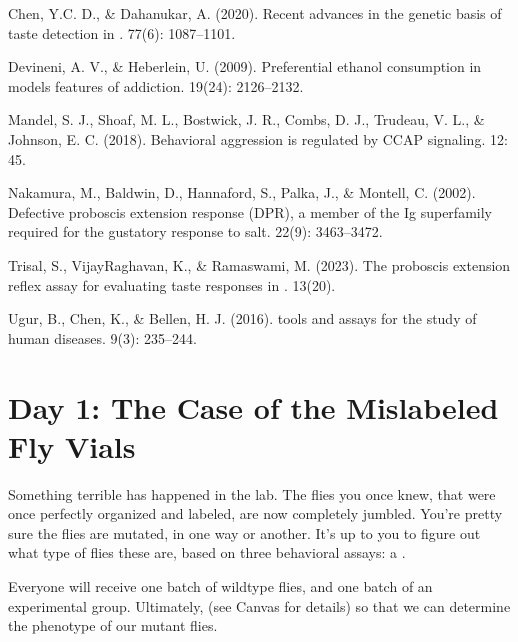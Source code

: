 \documentclass[letterpaper,10pt,english]{jupyterBook}
\begin{document}
\sphinxAtStartPar
Chen, Y.\sphinxhyphen{}C. D., \& Dahanukar, A. (2020). Recent advances in the genetic basis of taste detection in .  77(6): 1087–1101.

\sphinxAtStartPar
Devineni, A. V., \& Heberlein, U. (2009). Preferential ethanol consumption in  models features of addiction.  19(24): 2126–2132.

\sphinxAtStartPar
Mandel, S. J., Shoaf, M. L., Bostwick, J. R., Combs, D. J., Trudeau, V. L., \& Johnson, E. C. (2018). Behavioral aggression is regulated by  CCAP signaling.  12: 45.

\sphinxAtStartPar
Nakamura, M., Baldwin, D., Hannaford, S., Palka, J., \& Montell, C. (2002). Defective proboscis extension response (DPR), a member of the Ig superfamily required for the gustatory response to salt.  22(9): 3463–3472.

\sphinxAtStartPar
Trisal, S., VijayRaghavan, K., \& Ramaswami, M. (2023). The proboscis extension reflex assay for evaluating taste responses in .  13(20).

\sphinxAtStartPar
Ugur, B., Chen, K., \& Bellen, H. J. (2016).  tools and assays for the study of human diseases.  9(3): 235–244.

\sphinxstepscope


\section{Day 1: The Case of the Mislabeled Fly Vials}
\label{\detokenize{Drosophila/Day1:day-1-the-case-of-the-mislabeled-fly-vials}}\label{\detokenize{Drosophila/Day1::doc}}
\sphinxAtStartPar
Something terrible has happened in the lab. The flies you once knew, that were once perfectly organized and labeled, are now completely jumbled. You’re pretty sure the flies are mutated, in one way or another. It’s up to you to figure out what type of flies these are, based on three behavioral assays: a .

\sphinxAtStartPar
Everyone will receive one batch of wildtype flies, and one batch of an experimental group. Ultimately,  (see Canvas for details) so that we can determine the phenotype of our mutant flies.
\end{document}
